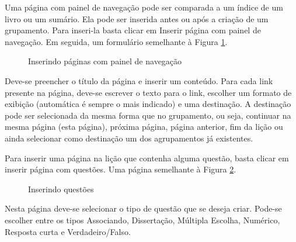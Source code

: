 Uma página com painel de navegação pode ser comparada a um índice de um livro ou um sumário. Ela pode ser inserida antes ou após a criação de um grupamento. Para inseri-la basta clicar em Inserir página com painel de navegação.  Em seguida, um formulário semelhante à Figura \ref{fig:cap5_54}.
\begin{figure}[htbp]
 \begin{center}
  \caption{Inserindo páginas com painel de navegação}
  \label{fig:cap5_54}
 \end{center}
\end{figure}
Deve-se preencher o título da página e inserir um conteúdo. Para cada link presente na página, deve-se escrever o texto para o link, escolher um formato de exibição (automática é sempre o mais indicado) e uma destinação. A destinação pode ser selecionada da mesma forma que no grupamento, ou seja, continuar na mesma página (esta página), próxima página, página anterior, fim da lição ou ainda selecionar como destinação um dos agrupamentos já existentes.

Para inserir uma página na lição que contenha alguma questão, basta clicar em inserir página com questões. Uma página semelhante à Figura \ref{fig:cap5_55}.

\begin{figure}[htbp]
 \begin{center}
  \caption{Inserindo questões}
  \label{fig:cap5_55}
 \end{center}
\end{figure}
Nesta página deve-se selecionar o tipo de questão que se deseja criar. Pode-se escolher entre os tipos Associando, Dissertação, Múltipla Escolha, Numérico, Resposta curta e Verdadeiro/Falso.

